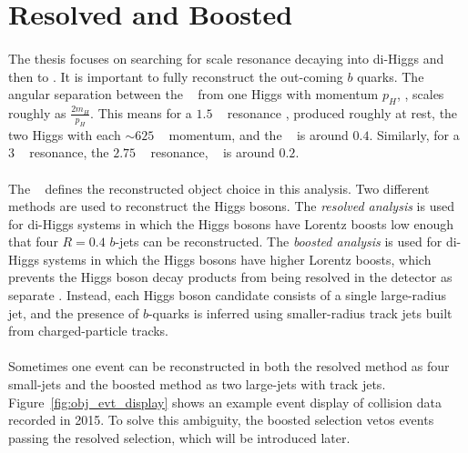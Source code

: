 \section{Resolved and Boosted}
\paragraph{}
The thesis focuses on searching for \TeV scale resonance decaying into di-Higgs and then to \bbbb. It is important to fully reconstruct the out-coming $b$ quarks. The angular separation between the \bb~ from one Higgs with momentum $p_{H}$, \drbb, scales roughly as $\frac{2m_H}{p_{H}}$. This means for a $1.5$ \TeV~ resonance \Grav, produced roughly at rest, the two Higgs with each $\sim 625$ \GeV~ momentum, and the \drbb~ is around $0.4$. Similarly, for a $3$ \TeV~ resonance, the $2.75$ \TeV~ resonance, \drbb~ is around $0.2$.

\paragraph{}
The \drbb~ defines the reconstructed object choice in this analysis. Two different methods are used to reconstruct the Higgs bosons. The \textit{resolved analysis} is used for di-Higgs systems in which the Higgs bosons have Lorentz boosts low enough that four $R=0.4$ $b$-jets can be reconstructed. The \textit{boosted analysis} is used for di-Higgs systems in which the Higgs bosons have higher Lorentz boosts, which prevents the Higgs boson decay products from being resolved in the detector as separate \bjets. Instead, each Higgs boson candidate consists of a single large-radius jet, and the presence of $b$-quarks is inferred using smaller-radius track jets built from charged-particle tracks.

\paragraph{}
Sometimes one event can be reconstructed in both the resolved method as four small-\R jets and the boosted method as two large-\R jets with track jets. Figure~\ref{fig:obj_evt_display} shows an example event display of collision data recorded in 2015. To solve this ambiguity, the boosted selection vetos events passing the resolved selection, which will be introduced later.

